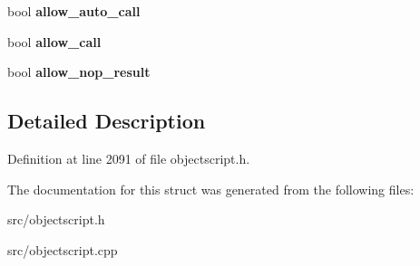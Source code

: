 \begin{DoxyCompactItemize}
\item 
bool {\bfseries allow\+\_\+auto\+\_\+call}\hypertarget{struct_object_script_1_1_o_s_1_1_core_1_1_compiler_1_1_params_ac6d8e50ebcc0d1ce963c95f41f08fe27}{}\label{struct_object_script_1_1_o_s_1_1_core_1_1_compiler_1_1_params_ac6d8e50ebcc0d1ce963c95f41f08fe27}

\item 
bool {\bfseries allow\+\_\+call}\hypertarget{struct_object_script_1_1_o_s_1_1_core_1_1_compiler_1_1_params_ae210ae1bcea7fb7c1914241500dd11c9}{}\label{struct_object_script_1_1_o_s_1_1_core_1_1_compiler_1_1_params_ae210ae1bcea7fb7c1914241500dd11c9}

\item 
bool {\bfseries allow\+\_\+nop\+\_\+result}\hypertarget{struct_object_script_1_1_o_s_1_1_core_1_1_compiler_1_1_params_a75e524452428182a9f6fe54fdd878226}{}\label{struct_object_script_1_1_o_s_1_1_core_1_1_compiler_1_1_params_a75e524452428182a9f6fe54fdd878226}

\end{DoxyCompactItemize}


\subsection{Detailed Description}


Definition at line 2091 of file objectscript.\+h.



The documentation for this struct was generated from the following files\+:\begin{DoxyCompactItemize}
\item 
src/objectscript.\+h\item 
src/objectscript.\+cpp\end{DoxyCompactItemize}
